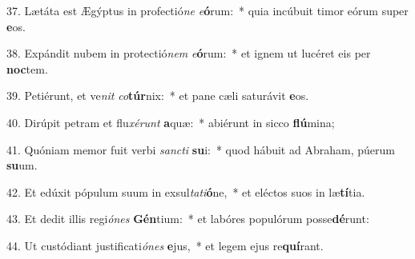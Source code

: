 37. Lætáta est Ægýptus in profectió\textit{ne} \textit{e}\textbf{ó}rum:~*  quia incúbuit timor eórum super \textbf{e}os.\

38. Expándit nubem in protectió\textit{nem} \textit{e}\textbf{ó}rum:~*  et ignem ut lucéret eis per \textbf{noc}tem.\

39. Petiérunt, et ve\textit{nit} \textit{co}\textbf{túr}nix:~*  et pane cæli saturávit \textbf{e}os.\

40. Dirúpit petram et flu\textit{xé}\textit{runt} \textbf{a}quæ:~*  abiérunt in sicco \textbf{flú}mina;\

41. Quóniam memor fuit verbi \textit{sanc}\textit{ti} \textbf{su}i:~*  quod hábuit ad Abraham, púerum \textbf{su}um.\

42. Et edúxit pópulum suum in exsul\textit{ta}\textit{ti}\textbf{ó}ne,~*  et eléctos suos in læ\textbf{tí}tia.\

43. Et dedit illis regi\textit{ó}\textit{nes} \textbf{Gén}tium:~*  et labóres populórum posse\textbf{dé}runt:\

44. Ut custódiant justificati\textit{ó}\textit{nes} \textbf{e}jus,~*  et legem ejus re\textbf{quí}rant.\

